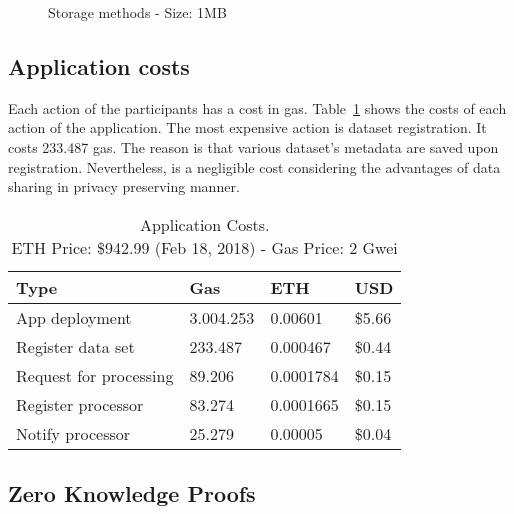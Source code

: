 \begin{figure}[!ht]
  \centering
  \caption{Storage methods - Size: 1MB}
  \label{fig:storage:charts:1mb}
\end{figure}

\subsection{Application costs}
\label{evaluation:app_costs}

Each action of the participants has a cost in gas. Table~\ref{table:app_costs} shows the costs of each action of the application. The most expensive action is dataset registration. It costs 233.487 gas. The reason is that various dataset's metadata are saved upon registration. Nevertheless, is a negligible cost considering the advantages of data sharing in privacy preserving manner.

\begin{table}[!htb]
\centering
\captionsetup{format=hang, justification=centering}
\caption[Application Costs]{Application Costs.\\ ETH Price: \$942.99 (Feb 18, 2018) - Gas Price: 2 Gwei}
\begin{tabular}{|l|l|l|l|}
\hline
 Type & Gas & ETH & USD \\ \hline
 App deployment & 3.004.253 & 0.00601 & \$5.66 \\ \hline
 Register data set & 233.487 & 0.000467 & \$0.44 \\ \hline
 Request for processing & 89.206 & 0.0001784 & \$0.15 \\ \hline
 Register processor & 83.274 & 0.0001665 & \$0.15 \\ \hline
 Notify processor & 25.279 & 0.00005 & \$0.04 \\ \hline
\end{tabular}
\label{table:app_costs}
\end{table}

\subsection{Zero Knowledge Proofs}
\label{evaluation:zkp}

